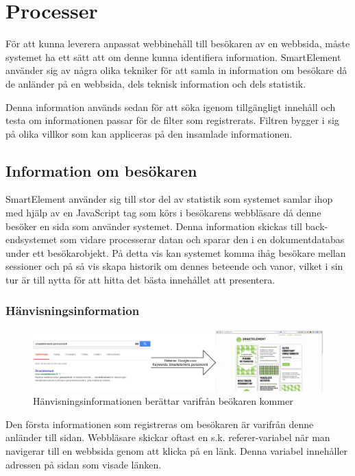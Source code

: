 \section{Processer}

För att kunna leverera anpassat webbinehåll till besökaren av en webbsida, måste systemet ha ett sätt att om denne kunna identifiera information. SmartElement använder sig av några olika tekniker för att samla in information om besökare då de anländer på en webbsida, dels teknisk information och dels statistik.

Denna information används sedan för att söka igenom tillgängligt innehåll och testa om informationen passar för de filter som registrerats. Filtren bygger i sig på olika villkor som kan appliceras på den insamlade informationen.

\subsection{Information om besökaren}

SmartElement använder sig till stor del av statistik som systemet samlar ihop med hjälp av en JavaScript tag som körs i besökarens webbläsare då denne besöker en sida som använder systemet. Denna information skickas till back-endsystemet som vidare processerar datan och sparar den i en dokumentdatabas under ett besökarobjekt. På detta vis kan systemet komma ihåg besökare mellan sessioner och på så vis skapa historik om dennes beteende och vanor, vilket i sin tur är till nytta för att hitta det bästa innehållet att presentera.

\subsubsection{Hänvisningsinformation}

\begin{figure}[h!]
\centering
\includegraphics[width=150mm]{assets/images/smelereferer.png}
\caption{Hänvisningsinformationen berättar varifrån beökaren kommer}
\label{referer}
\end{figure}

Den första informationen som registreras om besökaren är varifrån denne anländer till sidan. Webbläsare skickar oftast en s.k. referer-variabel när man navigerar till en webbsida genom att klicka på en länk. Denna variabel innehåller adressen på sidan som visade länken.

